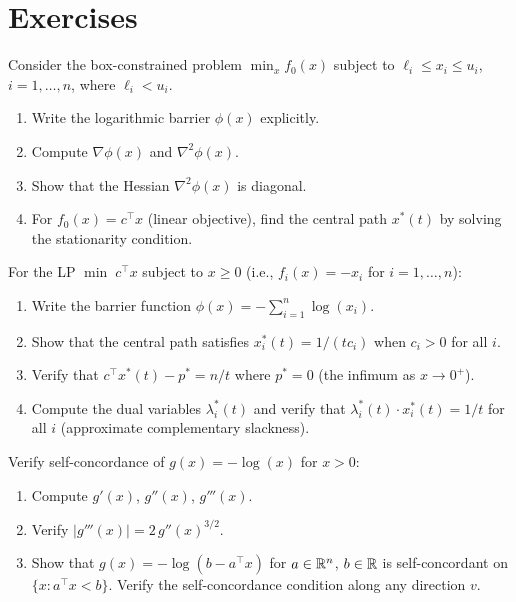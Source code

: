 \documentclass[11pt,a4paper]{article}
\begin{document}

\section{Exercises}\label{sec:exercises}

\begin{exercise}\label{ex:box-barrier}
Consider the box-constrained problem
$\min_x f_0(x)$ subject to $\ell_i \le x_i \le u_i$,
$i = 1, \dots, n$, where $\ell_i < u_i$.
\begin{enumerate}[label=(\alph*)]
  \item Write the logarithmic barrier $\phi(x)$ explicitly.
  \item Compute $\nabla\phi(x)$ and $\nabla^2\phi(x)$.
  \item Show that the Hessian $\nabla^2\phi(x)$ is diagonal.
  \item For $f_0(x) = c^\top x$ (linear objective), find the central
    path $x^*(t)$ by solving the stationarity condition.
\end{enumerate}
\end{exercise}

\begin{exercise}\label{ex:lp-central-path}
For the LP $\min\; c^\top x$ subject to $x \ge 0$ (i.e.,
$f_i(x) = -x_i$ for $i = 1, \dots, n$):
\begin{enumerate}[label=(\alph*)]
  \item Write the barrier function
    $\phi(x) = -\sum_{i=1}^n \log(x_i)$.
  \item Show that the central path satisfies $x_i^*(t) = 1/(tc_i)$
    when $c_i > 0$ for all $i$.
  \item Verify that $c^\top x^*(t) - p^* = n/t$ where $p^* = 0$
    (the infimum as $x \to 0^+$).
  \item Compute the dual variables $\lambda_i^*(t)$ and verify that
    $\lambda_i^*(t) \cdot x_i^*(t) = 1/t$ for all $i$
    (approximate complementary slackness).
\end{enumerate}
\end{exercise}

\begin{exercise}\label{ex:self-conc}
Verify self-concordance of $g(x) = -\log(x)$ for $x > 0$:
\begin{enumerate}[label=(\alph*)]
  \item Compute $g'(x)$, $g''(x)$, $g'''(x)$.
  \item Verify $|g'''(x)| = 2\,g''(x)^{3/2}$.
  \item Show that $g(x) = -\log(b - a^\top x)$ for $a \in \mathbb{R}^n$,
    $b \in \mathbb{R}$ is self-concordant on
    $\{x : a^\top x < b\}$. Verify the self-concordance condition
    along any direction $v$.
\end{enumerate}
\end{exercise}
\end{document}
